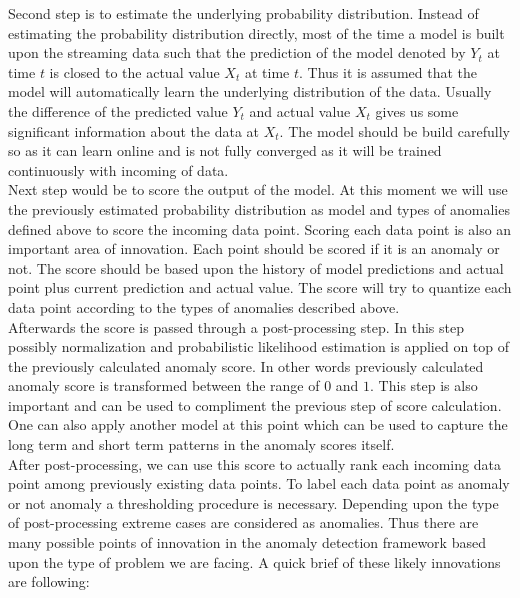 \documentclass[12pt]{article}
\begin{document}
Second step is to estimate the underlying probability distribution. Instead of estimating the probability distribution directly, most of the time a model is built upon the streaming data such that the prediction of the model denoted by $Y_t$ at time $t$ is closed to the actual value $X_t$ at time $t$. Thus it is assumed that the model will automatically learn the underlying distribution of the data. Usually the difference of the predicted value $Y_t$ and actual value $X_t$ gives us some significant information about the data at $X_t$. The model should be build carefully so as it can learn online and is not fully converged as it will be trained continuously with incoming of data.\\
\break
Next step would be to score the output of the model. At this moment we will use the previously estimated probability distribution as model and types of anomalies defined above to score the incoming data point. Scoring each data point is also an important area of innovation. Each point should be scored if it is an anomaly or not. The score should be based upon the history of model predictions and actual point plus current prediction and actual value. The score will try to quantize each data point according to the types of anomalies described above.\\
\break
Afterwards the score is passed through a post-processing step. In this step possibly normalization and probabilistic likelihood estimation is applied on top of the previously calculated anomaly score. In other words previously calculated anomaly score is transformed between the range of $0$ and $1$. This step is also important and can be used to compliment the previous step of score calculation. One can also apply another model at this point which can be used to capture the long term and short term patterns in the anomaly scores itself.\\
\break
After post-processing, we can use this score to actually rank each incoming data point among previously existing data points. To label each data point as anomaly or not anomaly a thresholding procedure is necessary. Depending upon the type of post-processing extreme cases are considered as anomalies.
Thus there are many possible points of innovation in the anomaly detection framework based upon the type of problem we are facing. A quick brief of these likely innovations are following:
\end{document}
